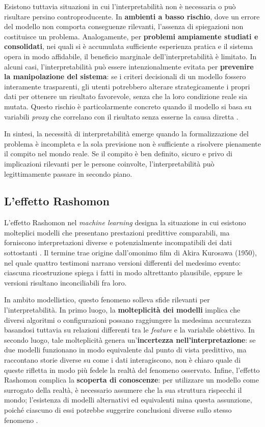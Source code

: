 Esistono tuttavia situazioni in cui l'interpretabilità non è necessaria o può risultare persino controproducente. In \textbf{ambienti a basso rischio}, dove un errore del modello non comporta conseguenze rilevanti, l'assenza di spiegazioni non costituisce un problema. Analogamente, per \textbf{problemi ampiamente studiati e consolidati}, nei quali si è accumulata sufficiente esperienza pratica e il sistema opera in modo affidabile, il beneficio marginale dell'interpretabilità è limitato. In alcuni casi, l'interpretabilità può essere intenzionalmente evitata per \textbf{prevenire la manipolazione del sistema}: se i criteri decisionali di un modello fossero interamente trasparenti, gli utenti potrebbero alterare strategicamente i propri dati per ottenere un risultato favorevole, senza che la loro condizione reale sia mutata. Questo rischio è particolarmente concreto quando il modello si basa su variabili \textit{proxy} che correlano con il risultato senza esserne la causa diretta \cite{molnar2025interpretable}.

In sintesi, la necessità di interpretabilità emerge quando la formalizzazione del problema è incompleta e la sola previsione non è sufficiente a risolvere pienamente il compito nel mondo reale. Se il compito è ben definito, sicuro e privo di implicazioni rilevanti per le persone coinvolte, l'interpretabilità può legittimamente passare in secondo piano.

\subsection{L'effetto Rashomon}

L'effetto Rashomon nel \textit{machine learning} designa la situazione in cui esistono molteplici modelli che presentano prestazioni predittive comparabili, ma forniscono interpretazioni diverse e potenzialmente incompatibili dei dati sottostanti \cite{molnar2025interpretable}. Il termine trae origine dall'omonimo film di Akira Kurosawa (1950), nel quale quattro testimoni narrano versioni differenti del medesimo evento: ciascuna ricostruzione spiega i fatti in modo altrettanto plausibile, eppure le versioni risultano inconciliabili fra loro.

In ambito modellistico, questo fenomeno solleva sfide rilevanti per l'interpretabilità. In primo luogo, la \textbf{molteplicità dei modelli} implica che diversi algoritmi o configurazioni possano raggiungere la medesima accuratezza basandosi tuttavia su relazioni differenti tra le \textit{feature} e la variabile obiettivo. In secondo luogo, tale molteplicità genera un'\textbf{incertezza nell'interpretazione}: se due modelli funzionano in modo equivalente dal punto di vista predittivo, ma raccontano storie diverse su come i dati interagiscono, non è chiaro quale di queste rifletta in modo più fedele la realtà del fenomeno osservato. Infine, l'effetto Rashomon complica la \textbf{scoperta di conoscenze}: per utilizzare un modello come surrogato della realtà, è necessario assumere che la sua struttura rispecchi il mondo; l'esistenza di modelli alternativi ed equivalenti mina questa assunzione, poiché ciascuno di essi potrebbe suggerire conclusioni diverse sullo stesso fenomeno \cite{molnar2025interpretable}.

